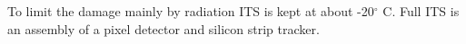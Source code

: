 To limit the damage mainly by  radiation ITS is kept at about -20$^{\circ}$ C. Full ITS is an assembly of a pixel detector and silicon strip tracker.
